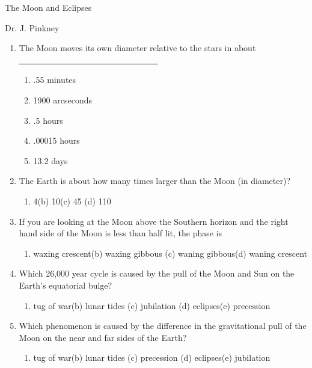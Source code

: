 \documentclass[12pt,thmsa]{article}
\begin{document}
\begin{center}
{\huge The Moon and Eclipses }

{\Large Dr. J. Pinkney}

\end{center}

\begin{enumerate}

\item The Moon moves its own diameter relative
to the stars in about \underline{~~~~~~~~~~~~~~~~~~~~~~~~~~~~~~~~~}
\begin{enumerate}
\item .55 minutes
\item 1900 arcseconds
\item .5 hours
\item .00015 hours
\item 13.2 days
\end{enumerate}

\item  The Earth is about how many times larger than the Moon (in diameter)?

\begin{enumerate}
\item  4\qquad (b) 10\qquad (c) 45 \qquad (d) 110
\end{enumerate}

\item  If you are looking at the Moon above the Southern horizon and the
right hand side of the Moon is less than half lit, the phase is

\begin{enumerate}
\item  waxing crescent\qquad (b) waxing gibbous \qquad (c) waning
gibbous\qquad (d) waning crescent
\end{enumerate}

\item  Which 26,000 year cycle is caused by the pull of the Moon and Sun 
on the Earth's equatorial bulge?
\begin{enumerate}
\item tug of war\qquad (b) lunar tides \qquad (c) jubilation \qquad (d)
eclipses\qquad (e) precession
\end{enumerate}

\item  Which phenomenon is caused by the difference in the gravitational
pull of the Moon on the near and far sides of the Earth?
\begin{enumerate}
\item  tug of war\qquad (b) lunar tides \qquad (c) precession \qquad (d)
eclipses\qquad (e) jubilation
\end{enumerate}


\end{enumerate}
\end{document}
